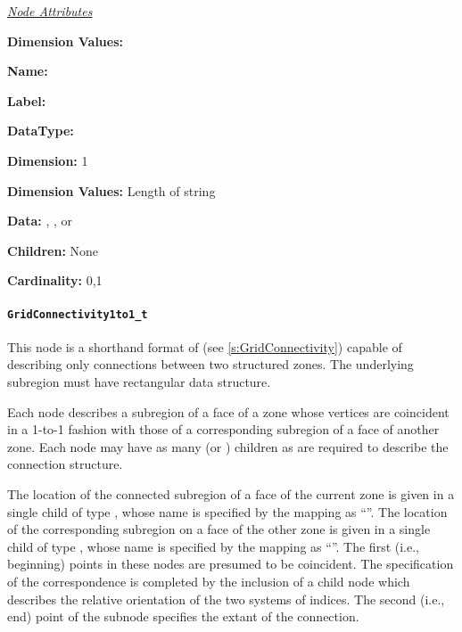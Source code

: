 \textit{\uline{Node Attributes}}
\begin{Ventryic}{\textbf{Dimension Values:}}
\item [\textbf{Name:}]
\item [\textbf{Label:}]
\item [\textbf{DataType:}]
\item [\textbf{Dimension:}]
      1
\item [\textbf{Dimension Values:}]
      Length of string
\item [\textbf{Data:}]
      , , or 
\item [\textbf{Children:}]
      None
\item [\textbf{Cardinality:}]
      0,1
\end{Ventryic}

\paragraph{\texttt{GridConnectivity1to1\_t}}

This node is a shorthand format of 
(see \autoref{s:GridConnectivity}) capable of describing only
 connections between two structured zones. The
underlying subregion must have rectangular data structure.

Each  node describes a subregion
of a face of a zone whose vertices are coincident in a 1-to-1
fashion with those of a corresponding subregion of a face of another
zone. Each  node may have as many
 (or ) children
as are required to describe the connection structure.

The location of the connected subregion of a face of the current zone
is given in a single child of type , whose name
is specified by the mapping as ``''. The location of
the corresponding subregion on a face of the other zone is given in
a single child of type , whose name is specified
by the mapping as ``''. The first (i.e.,
beginning) points in these  nodes are presumed to be
coincident. The specification of the correspondence is completed by the
inclusion of a  child node which describes the relative
orientation of the two systems of indices. The second (i.e., end) point
of the  subnode specifies the extant of the connection.

